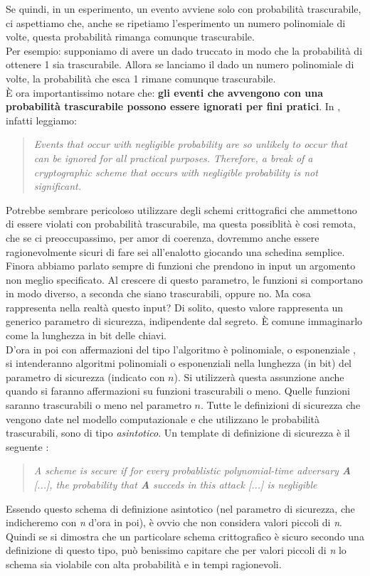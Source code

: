 \documentclass[a4paper,openright,twoside,12pt]{report}
\begin{document}
Se quindi, in un esperimento, un evento avviene solo con probabilit\`a trascurabile, ci aspettiamo che, anche se ripetiamo l'esperimento un numero polinomiale di volte, questa probabilit\`a
rimanga comunque trascurabile.\\
Per esempio: supponiamo di avere un dado truccato in modo che la probabilit\`a di ottenere 1 sia trascurabile. Allora se lanciamo il dado un numero polinomiale di volte, la probabilit\`a
che esca 1 rimane comunque trascurabile.\\
\`E ora importantissimo notare che:
\textbf{gli eventi che avvengono con una probabilit\`a trascurabile possono essere ignorati per fini pratici}.
In \cite{1206501}, infatti leggiamo:
\begin{quotation}
\emph{Events that occur with negligible probability are so unlikely to occur that can be ignored for all practical purposes. Therefore,
a break of a cryptographic scheme that occurs with negligible probability is not significant.}
\end{quotation}
Potrebbe sembrare pericoloso utilizzare degli schemi crittografici che ammettono di essere violati con probabilit\`a trascurabile, ma questa possiblit\`a \`e cosi remota, che se ci preoccupassimo, per amor di coerenza, dovremmo anche essere ragionevolmente sicuri di 
fare sei all'enalotto giocando una schedina semplice.
Finora abbiamo parlato sempre di funzioni che prendono in input un argomento non meglio specificato. 
Al crescere di questo parametro, le funzioni si comportano in modo diverso, a seconda che siano trascurabili, oppure no.
Ma cosa rappresenta nella realt\`a questo input?
Di solito, questo valore rappresenta un generico parametro di sicurezza, indipendente dal segreto. \`E comune immaginarlo come la lunghezza in bit delle chiavi.\\
D'ora in poi con affermazioni del tipo \flqq l'algoritmo \`e polinomiale, o esponenziale \frqq, si intenderanno algoritmi polinomiali o esponenziali nella lunghezza (in bit) del parametro di sicurezza (indicato con $n$). Si utilizzer\`a questa assunzione anche quando si faranno affermazioni su funzioni trascurabili o meno. Quelle funzioni saranno trascurabili o meno nel parametro $n$.
Tutte le definizioni di sicurezza che vengono date nel modello computazionale e che utilizzano le probabilit\`a trascurabili, sono di tipo \emph{asintotico}.
Un template di definizione di sicurezza è il seguente \cite{1206501}:
\begin{quotation}
\emph{A scheme is secure if for every probablistic polynomial-time adversary \textbf{A} [...], the probability that \textbf{A} succeds in this attack [...]
is negligible}
\end{quotation}
Essendo questo schema di definizione asintotico (nel parametro di sicurezza, che indicheremo con \emph{n} d'ora in poi), \`e ovvio che non considera valori piccoli di \emph{n}.
Quindi se si dimostra che un particolare schema crittografico \`e sicuro secondo una definizione di questo tipo, pu\`o benissimo capitare che per valori piccoli di \emph{n} lo schema
sia violabile con alta probabilit\`a e in tempi ragionevoli.
\newpage
\end{document}
